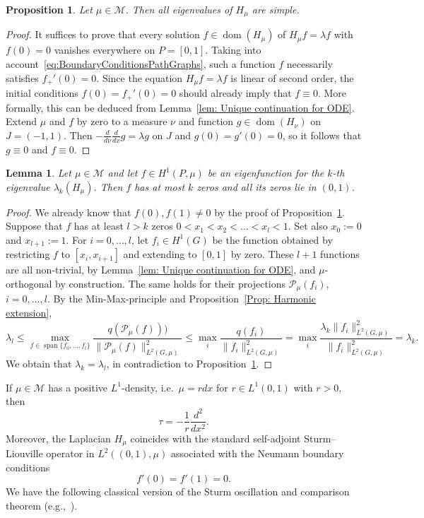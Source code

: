 \documentclass[reqno]{amsart}
\theoremstyle{plain}
\newtheorem{lem}[thm]{Lemma}
\newtheorem{prop}[thm]{Proposition}
\theoremstyle{definition}
\theoremstyle{remark}
\numberwithin{equation}{section}
\newcommand{\cM}{\mathcal{M}}
\newcommand{\dom}{\operatorname{dom}}
\newcommand{\Span}{\operatorname{span}}
\begin{document}
\begin{prop} \label{Pro: Simplicity of eigenvalues on the interval}
	Let $\mu \in \cM$. Then all eigenvalues of $H_\mu$ are simple.
\end{prop}
\begin{proof}
	It suffices to prove that every solution $f \in \dom(H_\mu)$ of $H_\mu f = \lambda f$ with $f(0) = 0$ vanishes everywhere on $P=[0,1]$. Taking into account~\eqref{eq:BoundaryConditionsPathGraphs}, such a function $f$ necessarily satisfies $f_+'(0) =0$. Since the equation $H_\mu f = \lambda f$ is linear of second order, the initial conditions $f(0)= f_+'(0)= 0$ should already imply that $f \equiv 0$.
	More formally, this can be deduced from Lemma~\ref{lem: Unique continuation for ODE}. Extend $\mu$ and $f$ by zero to a measure $\nu$ and function $g \in \dom(H_\nu)$ on $J =(-1, 1)$. Then $-\frac{d}{d\nu} \frac{d}{d x } g = \lambda g$ on $J$ and $g(0)= g'(0)= 0$, so it follows that $g \equiv 0$ and $f \equiv 0$. 
\end{proof}


\begin{lem} \label{lem: upper zero bound}
	Let $\mu \in \cM$ and let $f \in H^1(P, \mu)$ be an eigenfunction for the $k$-th eigenvalue $\lambda_k(H_\mu)$. Then $f$ has at most $k$ zeros and all its zeros lie in $(0,1)$.
\end{lem}
\begin{proof}
	We already know that $f(0), f(1) \neq 0$ by the proof of Proposition~\ref{Pro: Simplicity of eigenvalues on the interval}. Suppose that $f$ has at least $l>k$ zeros $0 < x_1 < x_2 < \dots < x_{l} < 1$. Set also $x_0:=0$  and $x_{l+1} :=1$. For $i=0, \dots, l$, let $f_i \in H^1(G)$ be the function obtained by restricting $f$ to $[x_i, x_{i+1}]$ and extending to $[0,1]$ by zero. These $l+1$ functions are all non-trivial, by Lemma~\ref{lem: Unique continuation for ODE}, and $\mu$-orthogonal by construction. The same holds for their projections $\mathcal{P}_\mu(f_i)$, $i=0, \dots, l$. By the Min-Max-principle and Proposition~\ref{Prop: Harmonic extension},
	\[
	\lambda_l \leq  \max_{f \in \Span\{f_0, \dots, f_l\}} \frac{ q(\mathcal{P}_\mu(f)))}{\|\mathcal{P}_\mu(f)\|^2_{L^2(G, \mu)}} \le \max_i \frac{ q(f_i)}{\|f_i\|^2_{L^2(G, \mu)}} =  \max_{i} \frac{\lambda_k\|f_i\|^2_{L^2(G, \mu)}}{\|f_i\|^2_{L^2(G, \mu)}} = \lambda_k.\]
	We obtain that $\lambda_k = \lambda_l$, in contradiction to Proposition~\ref{Pro: Simplicity of eigenvalues on the interval}.	
\end{proof}
If $\mu \in \cM$ has a positive $L^1$-density, i.e.~$\mu = r dx$ for $r \in L^1(0,1)$ with $r>0$, then
\[
\tau = - \frac{1}{r} \frac{d^2}{dx^2}.
\]
Moreover, the Laplacian $H_\mu$ coincides with the standard self-adjoint Sturm--Liouville operator in $L^2((0,1), \mu)$ associated with the Neumann boundary conditions
\[
f'(0) = f'(1)= 0.
\]
We have the following classical version of the Sturm oscillation and comparison theorem (e.g.,~\cite[Theorem 6.1.1 and Theorem 6.1.2]{Bennewitz2020-hu}).
\end{document}
